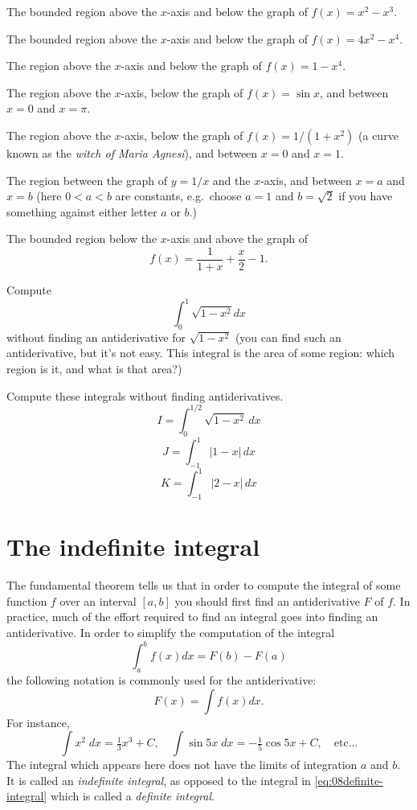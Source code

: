\begin{multicols}{2}
\problem The bounded region above the $x$-axis and below the graph of $f(x) = x^2-x^3$. %

\problem The bounded region above the $x$-axis and below the graph of $f(x) = 4x^2-x^4$. %

\problem The region above the $x$-axis and below the graph of $f(x) = 1-x^4$. %

\problem The region above the $x$-axis, below the graph of $f(x) = \sin x$, and %
between $x=0$ and $x=\pi$.

\problem The region above the $x$-axis, below the graph of $f(x) = 1/(1+x^2)$ (a %
curve known as the \textit{witch of Maria Agnesi}), and between $x=0$ and
$x=1$.

\problem The region between the graph of $y=1/x$ and the $x$-axis, and between %
$x=a$ and $x=b$ (here $0<a<b$ are constants, e.g.\ choose $a=1$ and $b=
\sqrt2$ if you have something against either letter $a$ or $b$.)

\problem The bounded region below the $x$-axis and above the graph of %
\[
f(x) = \frac1{1+x} + \frac x2 -1.
\]

\problem Compute %
\[
\int_0^{1}\sqrt{1-x^2} dx
\]
without finding an antiderivative for $\sqrt{1-x^2}$ (you can find such
an antiderivative, but it's not easy.  This integral is the area of
some region: which region is it, and what is that area?)

\problem \groupproblem Compute these integrals without finding antiderivatives. %
\[
I = \int_0^{1/2}\sqrt{1-x^2}\,dx
\]
\[
J=\int_{-1}^1 |1-x|\,dx
\]
\[
K=\int_{-1}^1 |2-x|\,dx
\]



\end{multicols}
\noproblemfont

\section{The indefinite integral} %
\label{sec:indefinite-integral}
The fundamental theorem tells us that in order to compute the integral
of some function $f$ over an interval $[a,b]$ you should first find an
antiderivative $F$ of $f$.  In practice, much of the effort required
to find an integral goes into finding an antiderivative.  In order to
simplify the computation of the integral
\begin{equation}
  \label{eq:08definite-integral}
  \int_a^b f(x) dx = F(b)-F(a)
\end{equation}
the following notation is commonly used for the antiderivative:
\begin{equation}
  \label{eq:08indefinite-integral}
  F(x) = \int f(x) d x .
\end{equation}
For instance,
\[
\int x^2 \;dx = \tfrac13x^3+C,\quad \int \sin 5x\; dx = -\tfrac15\cos 5x+C,
\quad\textrm{etc}\ldots
\]
The integral which appears here does not have the limits of integration
$a$ and $b$.  It is called an \emph{indefinite integral}, as opposed
to the integral in \eqref{eq:08definite-integral} which is called a
\emph{definite integral}.



